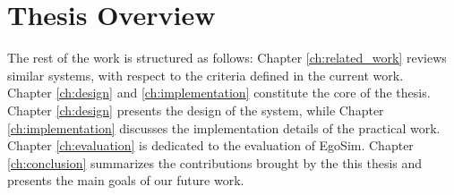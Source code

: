 \section{Thesis Overview} %
\label{sub:thesis_overview}

The rest of the work is structured as follows: Chapter \ref{ch:related_work} reviews similar systems, with respect to the criteria defined in the current work.\\

Chapter \ref{ch:design} and \ref{ch:implementation} constitute the core of the thesis. Chapter \ref{ch:design} presents the design of the system, while Chapter \ref{ch:implementation} discusses the implementation details of the practical work.\\

Chapter \ref{ch:evaluation} is dedicated to the evaluation of EgoSim. Chapter \ref{ch:conclusion} summarizes the contributions brought by the this thesis and presents the main goals of our future work.

